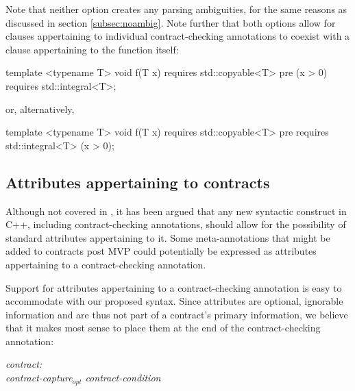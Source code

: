 Note that neither option creates any parsing ambiguities, for the same reasons as discussed in section \ref{subsec:noambig}. Note further that both options allow for  clauses appertaining to individual contract-checking annotations to coexist with a  clause appertaining to the function itself:

\vspace{2mm}
\begin{codeblock}
template <typename T>
void f(T x)
  requires std::copyable<T>
  pre (x > 0) requires std::integral<T>;
\end{codeblock}
\vspace{2mm}

or, alternatively,

\vspace{2mm}
\begin{codeblock}
template <typename T>
void f(T x)
  requires std::copyable<T>
  pre requires std::integral<T> (x > 0);
\end{codeblock}
\vspace{2mm}


\subsection{Attributes appertaining to contracts}
\label{subsec:attr}

Although not covered in \cite{P2885R2}, it has been argued that any new syntactic construct in C++, including contract-checking annotations, should allow for the possibility of standard attributes appertaining to it. Some meta-annotations that might be added to contracts post MVP could potentially be expressed as attributes appertaining to a contract-checking annotation.

Support for attributes appertaining to a contract-checking annotation is easy to accommodate with our proposed syntax. Since attributes are optional, ignorable information and are thus not part of a contract's primary information, we believe that it makes most sense to place them at the end of the contract-checking annotation:

\begin{adjustwidth}{0.5cm}{0.5cm}

\emph{contract:} \\
\phantom{~~~}\emph{contract-capture}$_{opt}$ \emph{contract-condition} 

\end{adjustwidth}

